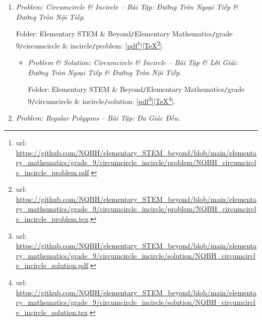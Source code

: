 \documentclass[12pt]{article}
\begin{document}
\begin{enumerate}
\begin{itemize}
		Folder: {\sf Elementary STEM \& Beyond{\tt/}Elementary Mathematics{\tt/}grade 9{\tt/}2nd-order function, quadratic equation{\tt/}solution}: [\href{https://github.com/NQBH/elementary_STEM_beyond/blob/main/elementary_mathematics/grade_9/2nd_order_function/solution/NQBH_2nd_order_function_solution.pdf}{pdf}\footnote{{\sc url}: \url{https://github.com/NQBH/elementary_STEM_beyond/blob/main/elementary_mathematics/grade_9/2nd_order_function/solution/NQBH_2nd_order_function_solution.pdf}.}][\href{https://github.com/NQBH/elementary_STEM_beyond/blob/main/elementary_mathematics/grade_9/2nd_order_function/solution/NQBH_2nd_order_function_solution.tex}{\TeX}\footnote{{\sc url}: \url{https://github.com/NQBH/elementary_STEM_beyond/blob/main/elementary_mathematics/grade_9/2nd_order_function/solution/NQBH_2nd_order_function_solution.tex}.}].
	\end{itemize}
	\item {\it Problem: Circumcircle {\it\&} Incircle -- Bài Tập: Đường Tròn Ngoại Tiếp {\it\&} Đường Tròn Nội Tiếp}.
	
	Folder: {\sf Elementary STEM \& Beyond{\tt/}Elementary Mathematics{\tt/}grade 9{\tt/}circumcircle \& incircle{\tt/}problem}: [\href{https://github.com/NQBH/elementary_STEM_beyond/blob/main/elementary_mathematics/grade_9/circumcircle_incircle/problem/NQBH_circumcircle_incircle_problem.pdf}{pdf}\footnote{{\sc url}: \url{https://github.com/NQBH/elementary_STEM_beyond/blob/main/elementary_mathematics/grade_9/circumcircle_incircle/problem/NQBH_circumcircle_incircle_problem.pdf}.}][\href{https://github.com/NQBH/elementary_STEM_beyond/blob/main/elementary_mathematics/grade_9/circumcircle_incircle/problem/NQBH_circumcircle_incircle_problem.tex}{\TeX}\footnote{{\sc url}: \url{https://github.com/NQBH/elementary_STEM_beyond/blob/main/elementary_mathematics/grade_9/circumcircle_incircle/problem/NQBH_circumcircle_incircle_problem.tex}.}].
	\begin{itemize}
		\item {\it Problem \& Solution: Circumcircle \& Incircle -- Bài Tập \& Lời Giải: Đường Tròn Ngoại Tiếp \& Đường Tròn Nội Tiếp}.
		
		Folder: {\sf Elementary STEM \& Beyond{\tt/}Elementary Mathematics{\tt/}grade 9{\tt/}circumcircle \& incircle{\tt/}solution}: [\href{https://github.com/NQBH/elementary_STEM_beyond/blob/main/elementary_mathematics/grade_9/circumcircle_incircle/solution/NQBH_circumcircle_incircle_solution.pdf}{pdf}\footnote{{\sc url}: \url{https://github.com/NQBH/elementary_STEM_beyond/blob/main/elementary_mathematics/grade_9/circumcircle_incircle/solution/NQBH_circumcircle_incircle_solution.pdf}.}][\href{https://github.com/NQBH/elementary_STEM_beyond/blob/main/elementary_mathematics/grade_9/circumcircle_incircle/solution/NQBH_circumcircle_incircle_solution.tex}{\TeX}\footnote{{\sc url}: \url{https://github.com/NQBH/elementary_STEM_beyond/blob/main/elementary_mathematics/grade_9/circumcircle_incircle/solution/NQBH_circumcircle_incircle_solution.tex}.}].
	\end{itemize}
	\item {\it Problem: Regular Polygons -- Bài Tập: Đa Giác Đều}.
	

\end{enumerate}
\end{document}
